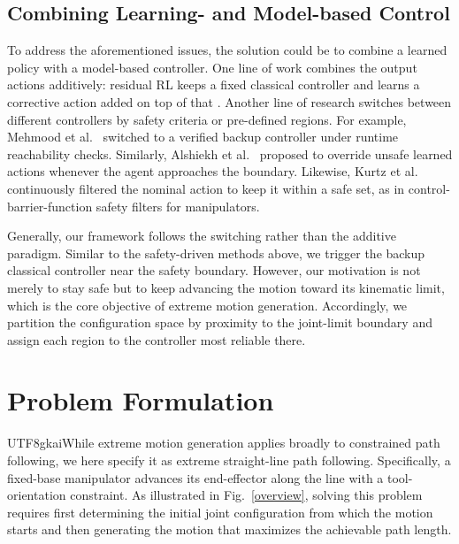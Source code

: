 \documentclass{svproc}
\newcommand{\xinyi}[1]{{\color{darkorange}\begin{CJK*}{UTF8}{gkai}#1\end{CJK*}}}
\begin{document}
\subsection{Combining Learning- and Model-based Control}
To address the aforementioned issues, the solution could be to combine a learned policy with a model-based controller. One line of work combines the output actions additively: residual RL keeps a fixed classical controller and learns a corrective action added on top of that \cite{johannink2019residual,silver2018residual}. Another line of research switches between different controllers by safety criteria or pre-defined regions. For example, Mehmood et al.~\cite{mehmood2022black} switched to a verified backup controller under runtime reachability checks. Similarly, Alshiekh et al.~\cite{alshiekh2018safe} proposed to override unsafe learned actions whenever the agent approaches the boundary. Likewise, Kurtz et al.~\cite{kurtz2021control} continuously filtered the nominal action to keep it within a safe set, as in control-barrier-function safety filters for manipulators.

Generally, our framework follows the switching rather than the additive paradigm. Similar to the safety-driven methods above, we trigger the backup classical controller near the safety boundary. However, our motivation is not merely to stay safe but to keep advancing the motion toward its kinematic limit, which is the core objective of extreme motion generation. Accordingly, we partition the configuration space by proximity to the joint-limit boundary and assign each region to the controller most reliable there.



\section{Problem Formulation}
\xinyi{While extreme motion generation applies broadly to constrained path following, we here specify it as extreme straight-line path following. Specifically, a fixed-base manipulator advances its end-effector along the line with a tool-orientation constraint. As illustrated in Fig.~\ref{overview}, solving this problem requires first determining the initial joint configuration from which the motion starts and then generating the motion that maximizes the achievable path length.}
\end{document}
